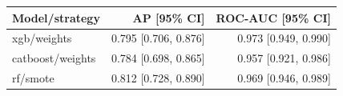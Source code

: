 \begin{tabular}{lrr}
\toprule
Model/strategy & AP [95\% CI] & ROC-AUC [95\% CI] \\
\midrule
xgb/weights & 0.795 [0.706, 0.876] & 0.973 [0.949, 0.990] \\
catboost/weights & 0.784 [0.698, 0.865] & 0.957 [0.921, 0.986] \\
rf/smote & 0.812 [0.728, 0.890] & 0.969 [0.946, 0.989] \\
\bottomrule
\end{tabular}
